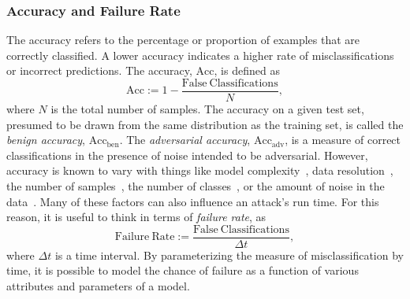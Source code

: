 \subsubsection{Accuracy and Failure Rate}

The accuracy refers to the percentage or proportion of examples that are correctly classified. A lower accuracy indicates a higher rate of misclassifications or incorrect predictions. The accuracy, $\mathrm{Acc}$, is defined as
\begin{equation}
    \mathrm{Acc} := 1 - \frac{\mathrm{False~Classifications}}{N},
    \label{eq:acc}
\end{equation}
where $N$ is the total number of samples. The accuracy on a given test set, presumed to be drawn from the same distribution as the training set, is called the \textit{benign accuracy}, $\mathrm{Acc}_{\mathrm{ben}}$. The \textit{adversarial accuracy}, $\mathrm{Acc}_{\mathrm{adv}}$, is a measure of correct classifications in the presence of noise intended to be adversarial. However, accuracy is known to vary with things like model complexity~\cite{vgg,resnet}, data resolution~\cite{feature_squeezing}, the number of samples~\cite{vapnik1994measuring}, the number of classes~\cite{dohmatob_generalized_2019}, or the amount of noise in the data~\cite{gauss_aug,gauss_out,dohmatob_generalized_2019}. Many of these factors can also influence an attack's run time. For this reason, it is useful to think in terms of \textit{failure rate}, as
\begin{equation}
    \mathrm{Failure~Rate} := \frac{\mathrm{False~Classifications}}{\Delta t} ,
    \label{eq:failure_rate}
\end{equation}
where $\Delta t$ is a time interval. By parameterizing the measure of misclassification by time, it is possible to model the chance of failure as a function of various attributes and parameters of a model.


